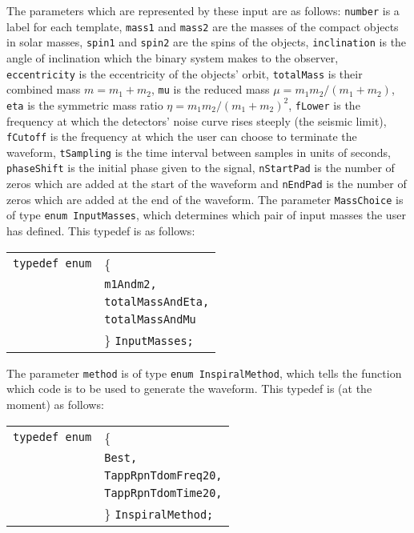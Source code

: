 \documentclass[12pt]{article}
\begin{document}
\vspace{5mm}




The parameters which are represented by these input are as follows: \texttt{number} is a label for each template, \texttt{mass1} and \texttt{mass2} are the masses of the compact objects in solar masses, \texttt{spin1} and \texttt{spin2} are the spins of the objects, \texttt{inclination} is the angle of inclination which the binary system makes to the observer, \texttt{eccentricity} is the eccentricity of the objects' orbit, \texttt{totalMass} is their combined mass $m=m_{1}+m_{2}$, \texttt{mu} is the reduced mass $\mu=m_{1}m_{2}/(m_{1}+m_{2})$, \texttt{eta} is the symmetric mass ratio $\eta=m_{1}m_{2}/(m_{1}+m_{2})^{2}$, \texttt{fLower} is the frequency at which the detectors' noise curve rises steeply (the seismic limit), \texttt{fCutoff} is the frequency at which the user can choose to terminate the waveform, \texttt{tSampling} is the time interval between samples in units of seconds, \texttt{phaseShift} is the initial phase given to the signal, \texttt{nStartPad} is the number of zeros which are added at the start of the waveform and \texttt{nEndPad} is the number of zeros which are added at the end of the waveform.
The parameter \texttt{MassChoice} is of type \texttt{enum InputMasses}, which determines which pair of input masses the user has defined. This typedef is as follows:

\vspace{5mm}

\begin{tabular}{ll}
\texttt{typedef enum} & \{ \\
                      & \texttt{m1Andm2,} \\
                      & \texttt{totalMassAndEta,}  \\
                      & \texttt{totalMassAndMu} \\
                      & \} \texttt{InputMasses;}
\end{tabular}

\vspace{5mm}

The parameter \texttt{method} is of type \texttt{enum InspiralMethod}, which tells the function which code is to be used to generate the waveform. This typedef is (at the moment) as follows:

\vspace{5mm}

\begin{tabular}{ll}
\texttt{typedef enum} & \{ \\
                      & \texttt{Best,} \\
                      & \texttt{TappRpnTdomFreq20,}  \\
                      & \texttt{TappRpnTdomTime20,} \\
                      & \} \texttt{InspiralMethod;}
\end{tabular}
\end{document}
